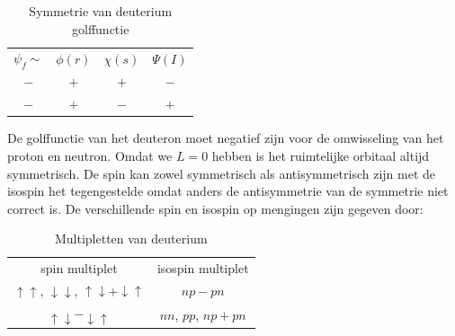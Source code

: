 \documentclass[../main.tex]{subfiles}
\begin{document}
\begin{table}[h]
    \centering
    \caption{Symmetrie van deuterium golffunctie}
    \label{tab:sym_deut_golf}
    \begin{tabular}{cccc}
        $\psi_f\sim$ & $\phi(r)$ & $\chi(s)$                & $\Psi(I)$             \\
        $-$             & $+$       & {\color{green} $+$}   & {\color{green} $-$}   \\
        $-$             & $+$       & {\color{red} $-$}     & {\color{red} $+$}     \\
    \end{tabular}
\end{table}

De golffunctie van het deuteron moet negatief zijn voor de omwisseling van het proton en neutron. Omdat we $L=0$ hebben is het ruimtelijke orbitaal altijd symmetrisch. De spin kan zowel symmetrisch als antisymmetrisch zijn met de isospin het tegengestelde omdat anders de antisymmetrie van de symmetrie niet correct is. De verschillende spin en isospin op mengingen zijn gegeven door:

\begin{table}[h]
    \centering
    \caption{Multipletten van deuterium}
    \label{tab:mult_deut}
    \begin{tabular}{cc}
        spin multiplet & isospin multiplet \\
        {\color{green} $\uparrow\uparrow$, $\downarrow\downarrow$, $\uparrow\downarrow+\downarrow\uparrow$} & {\color{green} $np-pn$} \\
        {\color{red} $\uparrow\downarrow-\downarrow\uparrow$} & {\color{red} $nn$, $pp$, $np+pn$}
    \end{tabular}
\end{table}
\end{document}
